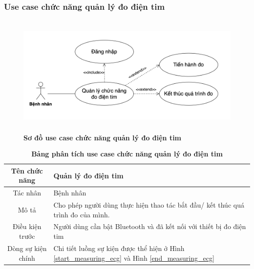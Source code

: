 \subsubsection{Use case chức năng quản lý đo điện tim}
  \begin{figure}[H]
    \centering
    \includegraphics[width=15cm,height=6cm]{Images/use_case/use_case_measure_ecg.png}
    \caption[Sơ đồ use case chức năng quản lý đo điện tim]{\bfseries \fontsize{12pt}{0pt}
    \selectfont Sơ đồ use case chức năng quản lý đo điện tim}
    \label{use_case_measure_ecg} %
  \end{figure}

  \begin{table}[H]
    \caption{\bfseries \fontsize{12pt}{0pt}\selectfont Bảng phân tích use case chức năng quản lý đo điện tim}
    \centering
    \begin{tabularx}{0.9\textwidth}{|c|X|}
      \hline
      \textbf{Tên chức năng} & \textbf{Quản lý đo điện tim} \\
      \hline
      Tác nhân & Bệnh nhân \\
      \hline
      Mô tả & Cho phép người dùng thực hiện thao tác bắt đầu/ kết thúc quá trình đo của mình. \\
      \hline
      Điều kiện trước & Người dùng cần bật Bluetooth và đã kết nối với thiết bị đo điện tim \\
      \hline
      Dòng sự kiện chính & 
        Chi tiết luồng sự kiện được thể hiện ở Hình \ref{start_measuring_ecg} và Hình \ref{end_measuring_ecg} \\
      \hline
    \end{tabularx}
  \end{table}

